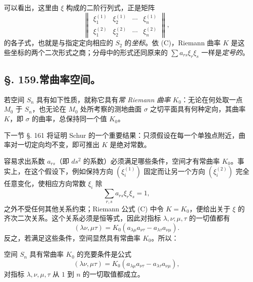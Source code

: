 可以看出，这里由 \(\xi\) 构成的二阶行列式，正是矩阵
\[
 \left\|\begin{matrix}
 \xi_1^{(1)}&\xi_2^{(1)}&\cdots&\xi_n^{(1)}\\
 \xi_1^{(2)}&\xi_2^{(2)}&\cdots&\xi_n^{(2)}
 \end{matrix}\right\|,
\]
的各子式，也就是与指定定向相应的 \(S_2\) 的\emph{坐标}。依 (C)，Riemann 曲率 \(K\) 是这些坐标的两个二次形式之商；分母中的形式还同原来的 \(\sum a_{rs}\xi_r\xi_s\) 一样是\emph{定号的}。

\subsection*{\S. 159.\quad 常曲率空间。}

若空间 \(S_n\) 具有如下性质，就称它具有\emph{常 Riemann 曲率} \(K_0\)：无论在何处取一点 \(M_0\) 于 \(S_n\)，也无论在 \(M_0\) 处所考察的测地曲面 \(\sigma\) 之切平面具有何种定向，其曲率 \(K\)，即 \(\sigma\) 的曲率，总保持同一个值 \(K_0\)。

下一节 \S. 161 将证明 Schur 的一个重要结果：只须假设在每一个单独点附近，曲率对一切定向均不变，即可推出 \(K\) 是绝对常数。

容易求出系数 \(a_{rs}\)（即 \(ds^2\) 的系数）必须满足哪些条件，空间才有常曲率 \(K_0\)。事实上，在这个假设下，例如保持方向 \((\xi_i^{(1)})\) 固定而让另一个方向 \((\xi_i^{(2)})\) 完全任意变化，使相应方向常数 \(\xi_i\) 除
\[
 \sum_{r,s}a_{rs}\xi_r\xi_s=1,
\]
之外不受任何其他关系约束；Riemann 公式 (C) 中令 \(K=K_0\)，便给出关于 \(\xi\) 的齐次二次关系。这个关系必须是恒等式，因此对指标 \(\lambda,\nu;\mu,\tau\) 的一切值都有
\[
 (\lambda\nu,\mu\tau)=K_0(a_{\lambda\mu}a_{\nu\tau}-a_{\lambda\tau}a_{\nu\mu}).
\]
反之，若满足这些条件，空间显然具有常曲率 \(K_0\)。所以：

\oldquote
空间 \(S_n\) 具有常曲率 \(K_0\) 的充要条件是公式
\closeoldquote
\begin{equation}\tag{15}
 (\lambda\nu,\mu\tau)=K_0(a_{\lambda\mu}a_{\nu\tau}-a_{\lambda\tau}a_{\nu\mu}),
\end{equation}
\oldquote
对指标 \(\lambda,\nu,\mu,\tau\) 从 \(1\) 到 \(n\) 的一切取值都成立。
\closeoldquote

